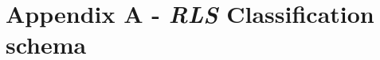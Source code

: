

\let\oldsectionmark\sectionmark %
\renewcommand{\sectionmark}[1]{}

\sectionmark{Appendix}

\captionsetup[figure]{list=no}
\captionsetup[table]{list=no}

\renewcommand{\thefigure}{S\arabic{figure}}
\renewcommand{\thetable}{S\arabic{table}}   

\setcounter{figure}{0}
\setcounter{table}{0}

\hypertarget{appendixA-chapter2}{%
\section*{\texorpdfstring{Appendix A - \emph{RLS} Classification
schema}{Appendix A - RLS Classification schema}}\label{appendixA-chapter2}}


